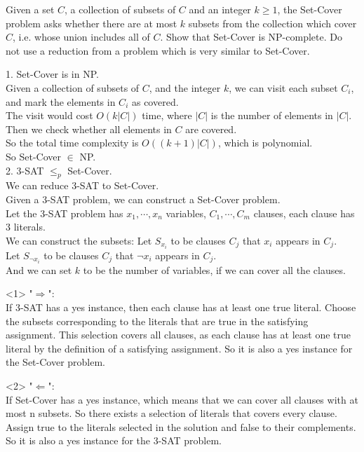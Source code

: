 \problem{}

Given a set $C$, a collection of subsets of $C$ and an integer $k \geq 1$, the Set-Cover problem asks whether there are at most $k$ subsets from the collection which cover $C$, i.e. whose union includes all of $C$. Show that Set-Cover is NP-complete. Do not use a reduction from a problem which is very similar to Set-Cover.

\solution{}

1. Set-Cover is in NP.\\
Given a collection of subsets of $C$, and the integer $k$, we can visit each subset $C_i$, and mark the elements in $C_i$ as covered.\\ The visit would cost $O(k|C|)$ time, where $|C|$ is the number of elements in $|C|$. Then we check whether all elements in $C$ are covered.\\
So the total time complexity is $O((k+1)|C|)$, which is polynomial.\\
So Set-Cover $\in$ NP.\\

2. 3-SAT $\leq_p$ Set-Cover.\\
We can reduce 3-SAT to Set-Cover.\\
Given a 3-SAT problem, we can construct a Set-Cover problem.\\
Let the 3-SAT problem has $x_1,\cdots,x_n$ variables, $C_1,\cdots,C_m$ clauses, each clause has 3 literals.\\
We can construct the subsets:
Let $S_{x_i}$ to be clauses $C_j$ that $x_i$ appears in $C_j$.\\
Let $S_{\neg x_i}$ to be clauses $C_j$ that $\neg x_i$ appears in $C_j$.\\
And we can set $k$ to be the number of variables, if we can cover all the clauses.


<1> "$\Rightarrow$":\\
If 3-SAT has a yes instance, then each clause has at least one true literal. Choose the subsets corresponding to the literals that are true in the satisfying assignment. This selection covers all clauses, as each clause has at least one true literal by the definition of a satisfying assignment. So it is also a yes instance for the Set-Cover problem.

<2> "$\Leftarrow$":\\
If Set-Cover has a yes instance, which means that we can cover all clauses with at most n subsets. So there exists a selection of literals that covers every clause. Assign true to the literals selected in the solution and false to their complements. So it is also a yes instance for the 3-SAT problem.

